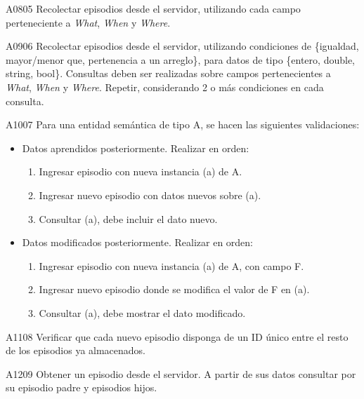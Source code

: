 \begin{def-validacion}{A}{08}{05}
	Recolectar episodios desde el servidor, utilizando cada campo perteneciente a \textit{What}, \textit{When} y \textit{Where}.
\end{def-validacion}

\begin{def-validacion}{A}{09}{06}
	Recolectar episodios desde el servidor, utilizando condiciones de \{igualdad, mayor/menor que, pertenencia a un arreglo\}, para datos de tipo \{entero, double, string, bool\}. Consultas deben ser realizadas sobre campos pertenecientes a \textit{What}, \textit{When} y \textit{Where}. Repetir, considerando 2 o más condiciones en cada consulta.
\end{def-validacion}

\begin{def-validacion}{A}{10}{07}
	Para una entidad semántica de tipo A, se hacen las siguientes validaciones:
	\begin{itemize}
		\item Datos aprendidos posteriormente. Realizar en orden:
		\begin{enumerate}
			\item Ingresar episodio con nueva instancia (a) de A.
			\item Ingresar nuevo episodio con datos nuevos sobre (a).
			\item Consultar (a), debe incluir el dato nuevo.
		\end{enumerate}
		\item Datos modificados posteriormente. Realizar en orden:
		\begin{enumerate}
			\item Ingresar episodio con nueva instancia (a) de A, con campo F.
			\item Ingresar nuevo episodio donde se modifica el valor de F en (a).
			\item Consultar (a), debe mostrar el dato modificado.
		\end{enumerate}
	\end{itemize}
\end{def-validacion}

\begin{def-validacion}{A}{11}{08}
Verificar que cada nuevo episodio disponga de un ID único entre el resto de los episodios ya almacenados.	
\end{def-validacion}

\begin{def-validacion}{A}{12}{09}
	Obtener un episodio desde el servidor. A partir de sus datos consultar por su episodio padre y episodios hijos.	
\end{def-validacion}

